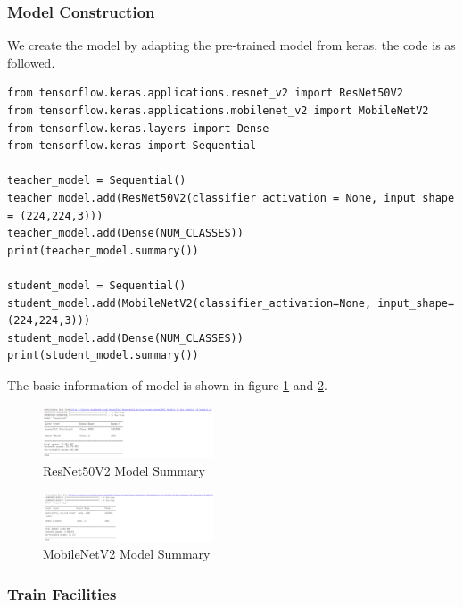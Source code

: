 \documentclass[conference]{IEEEtran}
\begin{document}
\subsubsection{Model Construction}

We create the model by adapting the pre-trained model from keras, the code is as followed.

\begin{lstlisting}
from tensorflow.keras.applications.resnet_v2 import ResNet50V2
from tensorflow.keras.applications.mobilenet_v2 import MobileNetV2
from tensorflow.keras.layers import Dense
from tensorflow.keras import Sequential

teacher_model = Sequential()
teacher_model.add(ResNet50V2(classifier_activation = None, input_shape = (224,224,3)))
teacher_model.add(Dense(NUM_CLASSES))
print(teacher_model.summary())

student_model = Sequential()
student_model.add(MobileNetV2(classifier_activation=None, input_shape=(224,224,3)))
student_model.add(Dense(NUM_CLASSES))
print(student_model.summary())
\end{lstlisting}

The basic information of model is shown in figure \ref{model-res} and \ref{model-mob}.

\begin{figure}[h] 
    \centering
    \includegraphics[width=0.45\textwidth]{./graphs/Task2/resnetv2.png}
    \caption{ResNet50V2 Model Summary}
    \label{model-res}
\end{figure}

\begin{figure}[h] 
    \centering
    \includegraphics[width=0.45\textwidth]{./graphs/Task2/mobilenetv2.png}
    \caption{MobileNetV2 Model Summary}
    \label{model-mob}
\end{figure}

\subsubsection{Train Facilities}
\end{document}
